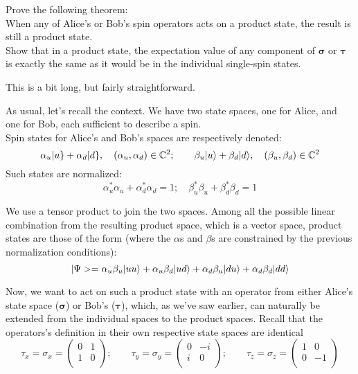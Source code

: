 \documentclass[solutions.tex]{subfiles}
\begin{document}
\maketitle
\begin{exercise} Prove the following theorem: \\

When any of Alice's or Bob's spin operators acts on a
product state, the result is still a product state. \\

Show that in a product state, the expectation value of
any component of $\bm{\sigma}$ or $\bm{\tau}$ is exactly
the same as it would be in the individual single-spin states.
\end{exercise}
\begin{remark} This is a bit long, but fairly straightforward.
\end{remark}

As usual, let's recall the context. We have two state spaces,
one for Alice, and one for Bob, each sufficient to describe
a spin. \\

Spin states for Alice's and Bob's spaces are respectively
denoted:
\[
	\alpha_u|u\} + \alpha_d|d\},\quad (\alpha_u, \alpha_d)\in\mathbb{C}^2;
	\qquad
	\beta_u|u\rangle + \beta_d|d\rangle,\quad (\beta_u, \beta_d)\in\mathbb{C}^2
\]
Such states are normalized:
\[
	\alpha_u^*\alpha_u + \alpha_d^*\alpha_d = 1;\quad
	\beta_u^*\beta_u + \beta_d^*\beta_d = 1
\]

We use a tensor product to join the two spaces. Among all
the possible linear combination from the resulting product
space, which is a vector space, product states are those of the
form (where the $\alpha$s and $\beta$s are constrained by the previous
normalization conditions):
\[
	|\Psi> = \alpha_u\beta_u|uu\rangle + \alpha_u\beta_d|ud\rangle
		+ \alpha_d\beta_u|du\rangle + \alpha_d\beta_d|dd\rangle
\]

Now, we want to act on such a product state with an operator
from either Alice's state space ($\bm{\sigma}$) or Bob's ($\bm{\tau}$),
which, as we've saw earlier, can naturally be extended from the
individual spaces to the product spaces. Recall that the operators's
definition in their own respective state spaces are identical
\[
	\tau_x = \sigma_x = \begin{pmatrix}
		0 & 1 \\
		1 & 0 \\
	\end{pmatrix};\qquad \tau_y = \sigma_y = \begin{pmatrix}
		0 & -i \\
		i & 0 \\
	\end{pmatrix};\qquad \tau_z = \sigma_z = \begin{pmatrix}
		1 & 0 \\
		0 & -1 \\
	\end{pmatrix}
\]
\end{document}
